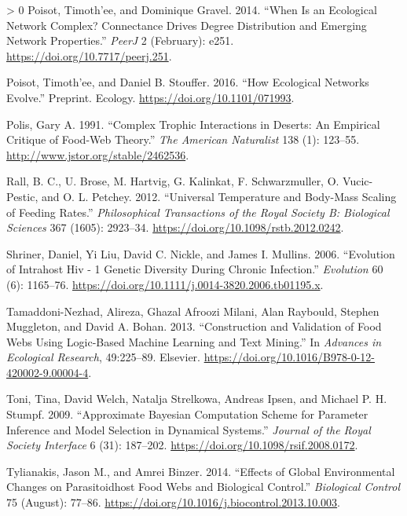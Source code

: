 \documentclass{article}
\newlength{\cslhangindent}
\newenvironment{CSLReferences}[3] %
 {%
  \setlength{\parindent}{0pt}
  \ifodd #1 \everypar{\setlength{\hangindent}{\cslhangindent}}\ignorespaces\fi
  \ifnum #2 > 0
  \setlength{\parskip}{#2\baselineskip}
  \fi
 }%
 {}
\begin{document}
\begin{CSLReferences}{1}{0}
\leavevmode\hypertarget{ref-poisotWhenEcologicalNetwork2014}{}%
Poisot, Timoth'ee, and Dominique Gravel. 2014. {``When Is an Ecological
Network Complex? {Connectance} Drives Degree Distribution and Emerging
Network Properties.''} \emph{PeerJ} 2 (February): e251.
\url{https://doi.org/10.7717/peerj.251}.

\leavevmode\hypertarget{ref-poisotHowEcologicalNetworks2016}{}%
Poisot, Timoth'ee, and Daniel B. Stouffer. 2016. {``How Ecological
Networks Evolve.''} Preprint. {Ecology}.
\url{https://doi.org/10.1101/071993}.

\leavevmode\hypertarget{ref-polisComplexTrophicInteractions1991}{}%
Polis, Gary A. 1991. {``Complex {Trophic Interactions} in {Deserts}: {An
Empirical Critique} of {Food}-{Web Theory}.''} \emph{The American
Naturalist} 138 (1): 123--55. \url{http://www.jstor.org/stable/2462536}.

\leavevmode\hypertarget{ref-rallUniversalTemperatureBodymass2012}{}%
Rall, B. C., U. Brose, M. Hartvig, G. Kalinkat, F. Schwarzmuller, O.
Vucic-Pestic, and O. L. Petchey. 2012. {``Universal Temperature and
Body-Mass Scaling of Feeding Rates.''} \emph{Philosophical Transactions
of the Royal Society B: Biological Sciences} 367 (1605): 2923--34.
\url{https://doi.org/10.1098/rstb.2012.0242}.

\leavevmode\hypertarget{ref-shrinerEvolutionIntrahostHiv2006}{}%
Shriner, Daniel, Yi Liu, David C. Nickle, and James I. Mullins. 2006.
{``Evolution of {Intrahost Hiv} - 1 {Genetic Diversity During Chronic
Infection}.''} \emph{Evolution} 60 (6): 1165--76.
\url{https://doi.org/10.1111/j.0014-3820.2006.tb01195.x}.

\leavevmode\hypertarget{ref-tamaddoni-nezhadConstructionValidationFood2013}{}%
Tamaddoni-Nezhad, Alireza, Ghazal Afroozi Milani, Alan Raybould, Stephen
Muggleton, and David A. Bohan. 2013. {``Construction and {Validation} of
{Food Webs Using Logic}-{Based Machine Learning} and {Text Mining}.''}
In \emph{Advances in {Ecological Research}}, 49:225--89. {Elsevier}.
\url{https://doi.org/10.1016/B978-0-12-420002-9.00004-4}.

\leavevmode\hypertarget{ref-toniApproximateBayesianComputation2009}{}%
Toni, Tina, David Welch, Natalja Strelkowa, Andreas Ipsen, and Michael
P. H. Stumpf. 2009. {``Approximate {Bayesian} Computation Scheme for
Parameter Inference and Model Selection in Dynamical Systems.''}
\emph{Journal of the Royal Society Interface} 6 (31): 187--202.
\url{https://doi.org/10.1098/rsif.2008.0172}.

\leavevmode\hypertarget{ref-tylianakisEffectsGlobalEnvironmental2014}{}%
Tylianakis, Jason M., and Amrei Binzer. 2014. {``Effects of Global
Environmental Changes on Parasitoid{}host Food Webs and Biological
Control.''} \emph{Biological Control} 75 (August): 77--86.
\url{https://doi.org/10.1016/j.biocontrol.2013.10.003}.


\end{CSLReferences}
\end{document}
